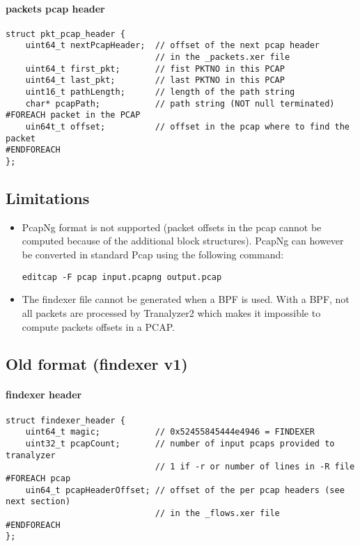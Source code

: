 \documentclass[documentation]{subfiles}
\begin{document}
\paragraph{packets pcap header}
\begin{verbatim}
struct pkt_pcap_header {
    uint64_t nextPcapHeader;  // offset of the next pcap header
                              // in the _packets.xer file
    uint64_t first_pkt;       // fist PKTNO in this PCAP
    uint64_t last_pkt;        // last PKTNO in this PCAP
    uint16_t pathLength;      // length of the path string
    char* pcapPath;           // path string (NOT null terminated)
#FOREACH packet in the PCAP
    uin64t_t offset;          // offset in the pcap where to find the packet
#ENDFOREACH
};
\end{verbatim}

\subsection{Limitations}

\begin{itemize}
    \item PcapNg format is not supported (packet offsets in the pcap cannot be computed because of the
        additional block structures). PcapNg can however be converted in standard Pcap using the
        following command:

    {\tt editcap -F pcap input.pcapng output.pcap}
    \item The findexer file cannot be generated when a BPF is used. With a BPF, not all packets are
        processed by Tranalyzer2 which makes it impossible to compute packets offsets in a PCAP.
\end{itemize}

\subsection{Old format (findexer v1)}

\paragraph{findexer header}
\begin{verbatim}
struct findexer_header {
    uint64_t magic;           // 0x52455845444e4946 = FINDEXER
    uint32_t pcapCount;       // number of input pcaps provided to tranalyzer
                              // 1 if -r or number of lines in -R file
#FOREACH pcap
    uin64_t pcapHeaderOffset; // offset of the per pcap headers (see next section)
                              // in the _flows.xer file
#ENDFOREACH
};
\end{verbatim}
\end{document}
